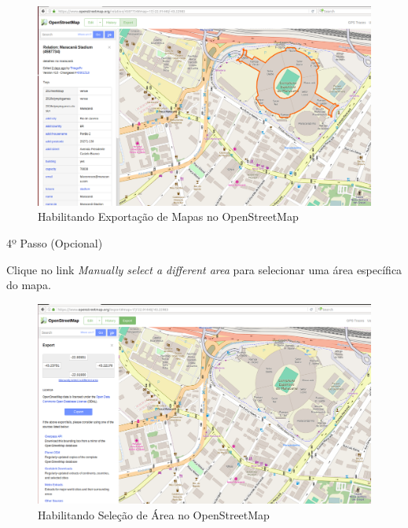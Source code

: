\documentclass[
12pt,				%
openright,			%
oneside,			%
a4paper,			%
brazil,				%
]{abntex2}
\begin{document}
{\begin{anexosenv}
                \begin{figure} [H]
	                \centering
	                \includegraphics[scale=.3]{figuras/aneC/71HabilitandoExportacao}
	                \caption{\label{fig_71}Habilitando Exportação de Mapas no OpenStreetMap}
                \end{figure}
                    

            	\begin{description}
                    \item[4º Passo (Opcional)]
                \end{description}
                \par Clique no link \textit{Manually select a different area} para selecionar uma área específica do mapa.
		            
                \begin{figure} [H]
	                \centering
	                \includegraphics[scale=.3]{figuras/aneC/72HabilitandoSelecao}
	                \caption{\label{fig_72}Habilitando Seleção de Área no OpenStreetMap}
                \end{figure}
		            

\end{anexosenv}}
\end{document}

